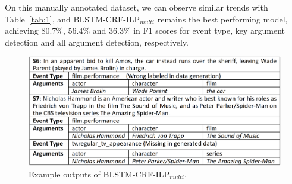 On this manually annotated dataset, we can observe similar trends with Table~\ref{tab:1}, and BLSTM-CRF-ILP$_{multi}$ remains the best performing model, achieving 80.7\%, 56.4\% and 36.3\% in F1 scores for event type, key argument detection and all argument detection, respectively.


\begin{figure}[t!]
	\centering
	\includegraphics[width=.48\textwidth]{figure3(3).png}
    \vspace{-3mm}
	\caption{Example outputs of BLSTM-CRF-ILP$_{multi}$.\label{fig:1}}
    \vspace{-3mm}
\end{figure}




